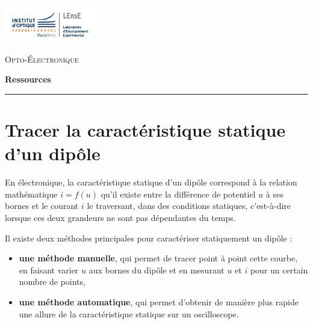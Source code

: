 \newpage
\pagestyle{empty}

\begin{minipage}[c]{.25\linewidth}
	\includegraphics[width=4cm]{images/Logo-LEnsE.png}
\end{minipage} \hfill
\begin{minipage}[c]{.4\linewidth}

\begin{center}
\vspace{0.3cm}
{\Large \textsc{Opto-Électronique}}

\medskip

\textbf{\Large Ressources}

\end{center}
\end{minipage}\hfill

\vspace{0.5cm}

\noindent \rule{\linewidth}{1pt}
\section{Tracer la caractéristique statique d'un dipôle}
\label{ressource:CaracStat}



En électronique, la caractéristique statique d'un dipôle correspond à la relation mathématique $i=f(u)$ qu'il existe entre la différence de potentiel $u$ à ses bornes et le courant $i$ le traversant, dans des conditions statiques, c'est-à-dire lorsque ces deux grandeurs ne sont pas dépendantes du temps.

\medskip

Il existe deux méthodes principales pour caractériser statiquement un dipôle :

\begin{itemize}
	\item \textbf{une méthode manuelle}, qui permet de tracer point à point cette courbe, en faisant varier $u$ aux bornes du dipôle et en mesurant $u$ et $i$ pour un certain nombre de points,
	\item \textbf{une méthode automatique}, qui permet d'obtenir de manière plus rapide une allure de la caractéristique statique sur un oscilloscope.
\end{itemize}

